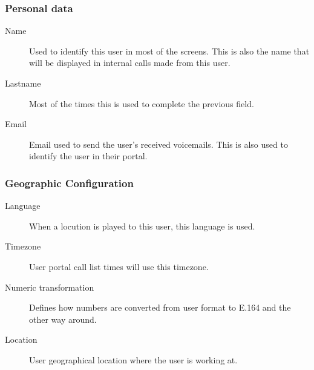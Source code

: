 \documentclass[letterpaper,10pt,english]{sphinxmanual}
\begin{document}
\subsubsection{Personal data}
\label{administration_portal/client/vpbx/users:personal-data}\begin{description}
\item[{Name}] \leavevmode{}\label{administration_portal/client/vpbx/users:term-name}
Used to identify this user in most of the screens. This is also the
name that will be displayed in internal calls made from this user.

\item[{Lastname}] \leavevmode{}\label{administration_portal/client/vpbx/users:term-lastname}
Most of the times this is used to complete the previous field.

\item[{Email}] \leavevmode{}\label{administration_portal/client/vpbx/users:term-email}
Email used to send the user's received voicemails. This is also used to
identify the user in their portal.

\end{description}


\subsubsection{Geographic Configuration}
\label{administration_portal/client/vpbx/users:geographic-configuration}\begin{description}
\item[{Language}] \leavevmode{}\label{administration_portal/client/vpbx/users:term-language}
When a locution is played to this user, this language is used.

\item[{Timezone}] \leavevmode{}\label{administration_portal/client/vpbx/users:term-timezone}
User portal call list times will use this timezone.

\item[{Numeric transformation}] \leavevmode{}\label{administration_portal/client/vpbx/users:term-numeric-transformation}
Defines how numbers are converted from user format to E.164 and
the other way around.

\item[{Location}] \leavevmode{}\label{administration_portal/client/vpbx/users:term-location}
User geographical location where the user is working at.

\end{description}
\end{document}
